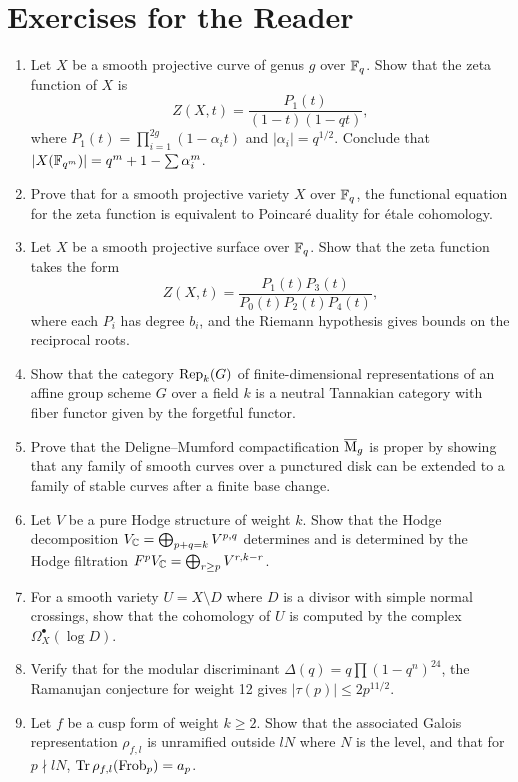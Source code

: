 \section*{Exercises for the Reader}

\begin{enumerate}
    \item [I] Let \(X\) be a smooth projective curve of genus \(g\) over \(\mathbb{F}_q\). Show that the zeta function of \(X\) is
    \[
    Z(X, t) = \frac{P_1(t)}{(1-t)(1-qt)},
    \]
    where \(P_1(t) = \prod_{i=1}^{2g} (1 - \alpha_i t)\) and \(|\alpha_i| = q^{1/2}\). Conclude that \(|X(\mathbb{F}_{q^m})| = q^m + 1 - \sum \alpha_i^m\).
    \item [I] Prove that for a smooth projective variety \(X\) over \(\mathbb{F}_q\), the functional equation for the zeta function is equivalent to Poincar\'e duality for \'etale cohomology.
    \item [I] Let \(X\) be a smooth projective surface over \(\mathbb{F}_q\). Show that the zeta function takes the form
    \[
    Z(X, t) = \frac{P_1(t) P_3(t)}{P_0(t) P_2(t) P_4(t)},
    \]
    where each \(P_i\) has degree \(b_i\), and the Riemann hypothesis gives bounds on the reciprocal roots.
    \item [I] Show that the category \(\operatorname{Rep}_k(G)\) of finite-dimensional representations of an affine group scheme \(G\) over a field \(k\) is a neutral Tannakian category with fiber functor given by the forgetful functor.
    \item [A] Prove that the Deligne--Mumford compactification \(\overline{\operatorname{M}}_g\) is proper by showing that any family of smooth curves over a punctured disk can be extended to a family of stable curves after a finite base change.
    \item [B] Let \(V\) be a pure Hodge structure of weight \(k\). Show that the Hodge decomposition \(V_{\mathbb{C}} = \bigoplus_{p+q=k} V^{p,q}\) determines and is determined by the Hodge filtration \(F^p V_{\mathbb{C}} = \bigoplus_{r \geq p} V^{r,k-r}\).
    \item [I] For a smooth variety \(U = X \setminus D\) where \(D\) is a divisor with simple normal crossings, show that the cohomology of \(U\) is computed by the complex \(\Omega_X^\bullet(\log D)\).
    \item [B] Verify that for the modular discriminant \(\Delta(q) = q \prod (1-q^n)^{24}\), the Ramanujan conjecture for weight 12 gives \(|\tau(p)| \leq 2 p^{11/2}\).
    \item [I] Let \(f\) be a cusp form of weight \(k \geq 2\). Show that the associated Galois representation \(\rho_{f,l}\) is unramified outside \(lN\) where \(N\) is the level, and that for \(p \nmid lN\), \(\operatorname{Tr} \rho_{f,l}(\operatorname{Frob}_p) = a_p\).

\end{enumerate}
